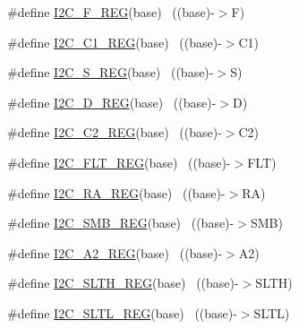 \begin{DoxyCompactItemize}
\item 
\#define \hyperlink{group___i2_c___register___accessor___macros_ga7aae8ba32e5e505c2db1bbc3b7c20213}{I2\+C\+\_\+\+F\+\_\+\+R\+EG}(base)                                                ~((base)-\/$>$F)
\item 
\#define \hyperlink{group___i2_c___register___accessor___macros_ga339b4af5c87abf62ac1689a412de6253}{I2\+C\+\_\+\+C1\+\_\+\+R\+EG}(base)                                              ~((base)-\/$>$C1)
\item 
\#define \hyperlink{group___i2_c___register___accessor___macros_ga6731d8ddb2a07ae27efc7424ef7fb218}{I2\+C\+\_\+\+S\+\_\+\+R\+EG}(base)                                                ~((base)-\/$>$S)
\item 
\#define \hyperlink{group___i2_c___register___accessor___macros_gae63c8db26394d46c618decb6ce6dbf32}{I2\+C\+\_\+\+D\+\_\+\+R\+EG}(base)                                                ~((base)-\/$>$D)
\item 
\#define \hyperlink{group___i2_c___register___accessor___macros_ga1b1cbd6dd49b0a63bf09270e7be600b3}{I2\+C\+\_\+\+C2\+\_\+\+R\+EG}(base)                                              ~((base)-\/$>$C2)
\item 
\#define \hyperlink{group___i2_c___register___accessor___macros_gabb230346f2358d18e6f9f126c3ae2398}{I2\+C\+\_\+\+F\+L\+T\+\_\+\+R\+EG}(base)                                            ~((base)-\/$>$F\+LT)
\item 
\#define \hyperlink{group___i2_c___register___accessor___macros_ga9b674394721710e98ba9123d38b6fa1a}{I2\+C\+\_\+\+R\+A\+\_\+\+R\+EG}(base)                                              ~((base)-\/$>$RA)
\item 
\#define \hyperlink{group___i2_c___register___accessor___macros_ga62f6225106137462aab11955b8264f81}{I2\+C\+\_\+\+S\+M\+B\+\_\+\+R\+EG}(base)                                            ~((base)-\/$>$S\+MB)
\item 
\#define \hyperlink{group___i2_c___register___accessor___macros_ga01c9da9747989c2d30eac15661d1f5c3}{I2\+C\+\_\+\+A2\+\_\+\+R\+EG}(base)                                              ~((base)-\/$>$A2)
\item 
\#define \hyperlink{group___i2_c___register___accessor___macros_gac1a6a43a0292446673c0d1d39cd69e21}{I2\+C\+\_\+\+S\+L\+T\+H\+\_\+\+R\+EG}(base)                                          ~((base)-\/$>$S\+L\+TH)
\item 
\#define \hyperlink{group___i2_c___register___accessor___macros_gaa9eb90e621e77e8758f4c7f6724b9011}{I2\+C\+\_\+\+S\+L\+T\+L\+\_\+\+R\+EG}(base)                                          ~((base)-\/$>$S\+L\+TL)

\end{DoxyCompactItemize}

